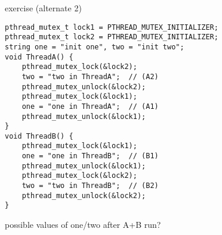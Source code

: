 \begin{frame}[fragile,label=lockExAlt2]{exercise (alternate 2)}
    \vspace{-0.5cm}
\begin{lstlisting}[style=smaller]
pthread_mutex_t lock1 = PTHREAD_MUTEX_INITIALIZER;
pthread_mutex_t lock2 = PTHREAD_MUTEX_INITIALIZER;
string one = "init one", two = "init two";
void ThreadA() {
    pthread_mutex_lock(&lock2);
    two = "two in ThreadA";  // (A2)
    pthread_mutex_unlock(&lock2);
    pthread_mutex_lock(&lock1);
    one = "one in ThreadA";  // (A1)
    pthread_mutex_unlock(&lock1);
}
void ThreadB() {
    pthread_mutex_lock(&lock1);
    one = "one in ThreadB";  // (B1)
    pthread_mutex_unlock(&lock1);
    pthread_mutex_lock(&lock2);
    two = "two in ThreadB";  // (B2)
    pthread_mutex_unlock(&lock2);
}
\end{lstlisting}
possible values of one/two after A+B run?
\end{frame}
